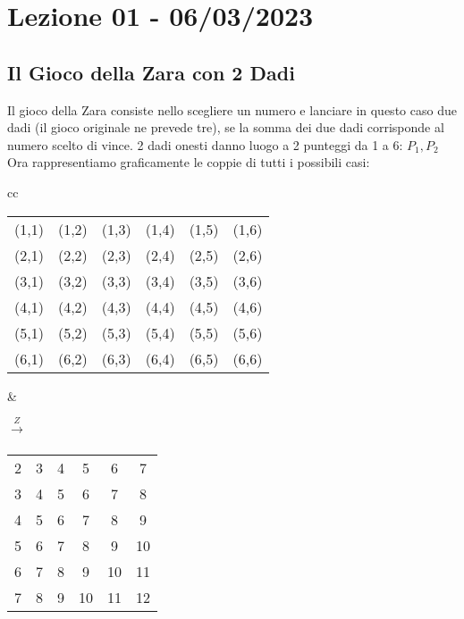 \section{Lezione 01 - 06/03/2023}

\subsection{Il Gioco della Zara con 2 Dadi}
Il gioco della Zara consiste nello scegliere un numero e lanciare in questo caso due dadi (il gioco originale ne prevede tre), se la somma dei due dadi corrisponde al numero scelto di vince.
2 dadi onesti danno luogo a 2 punteggi da 1 a 6: $P_1, P_2$\\
Ora rappresentiamo graficamente le coppie di tutti i possibili casi:

\begin{center}
\begin{tabular}{ cc }

\begin{tabular}{ |c|c|c|c|c|c| } 
 \hline
 (1,1) & (1,2) & (1,3) & (1,4) & (1,5) & (1,6) \\ 
 (2,1) & (2,2) & (2,3) & (2,4) & (2,5) & (2,6) \\ 
 (3,1) & (3,2) & (3,3) & (3,4) & (3,5) & (3,6) \\ 
 (4,1) & (4,2) & (4,3) & (4,4) & (4,5) & (4,6) \\ 
 (5,1) & (5,2) & (5,3) & (5,4) & (5,5) & (5,6) \\ 
 (6,1) & (6,2) & (6,3) & (6,4) & (6,5) & (6,6) \\ 
 \hline
\end{tabular} &

$\xrightarrow[]{Z}$

\begin{tabular}{ |c|c|c|c|c|c| } 
 \hline
 2 & 3 & 4 & 5 & 6 & 7 \\ 
 3 & 4 & 5 & 6 & 7 & 8 \\ 
 4 & 5 & 6 & 7 & 8 & 9 \\ 
 5 & 6 & 7 & 8 & 9 & 10 \\ 
 6 & 7 & 8 & 9 & 10 & 11 \\ 
 7 & 8 & 9 & 10 & 11 & 12 \\ 
 \hline
\end{tabular}\\

\end{tabular}
\end{center}


